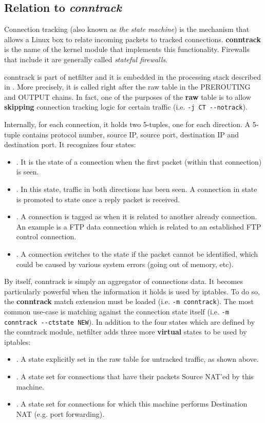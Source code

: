 \subsection{Relation to \emph{conntrack}}\label{sub-sec:conntrack}

Connection tracking (also known as \emph{the state machine}) is the mechanism
that allows a Linux box to relate incoming packets to tracked connections.
\textbf{conntrack} is the name of the kernel module that implements this
functionality.  Firewalls that include it are generally called \emph{stateful
firewalls}.

conntrack is part of netfilter and it is embedded in the processing stack
described in .  More
precisely, it is called right after the raw table in the PREROUTING and OUTPUT
chains.  In fact, one of the purposes of the \textbf{raw} table is to allow
\textbf{skipping} connection tracking logic for certain traffic (i.e.
\lstinline{-j CT --notrack}).

Internally, for each connection, it holds two 5-tuples, one for each direction.
A 5-tuple contains protocol number, source IP, source port, destination IP and
destination port.  It recognizes four states:
\begin{itemize}
  \item \NEW.  It is the state of a connection when the first packet
    (within that connection) is seen.
  \item \ESTABLISHED.  In this state, traffic in both directions has been seen.
    A connection in state \NEW is promoted to state \ESTABLISHED once a reply
    packet is received.
  \item \RELATED.  A connection is tagged as \RELATED when it is related to
    another already \ESTABLISHED connection.  An example is a FTP data
    connection which is related to an established FTP control connection.
  \item \INVALID.  A connection switches to the \INVALID state if the packet
    cannot be identified, which could be caused by various system errors (going
    out of memory, etc).
\end{itemize}

By itself, conntrack is simply an aggregator of connections data.  It becomes
particularly powerful when the information it holds is used by iptables.  To do
so, the \textbf{conntrack} match extension must be loaded (i.e.
\lstinline{-m conntrack}).  The most common use-case is matching against the
connection state itself (i.e. \lstinline{-m conntrack --ctstate NEW}).  In
addition to the four states which are defined by the conntrack module,
netfilter adds three more \textbf{virtual} states to be used by iptables:
\begin{itemize}
  \item \UNTRACKED.  A state explicitly set in the raw table for untracked
    traffic, as shown above.
  \item \SNAT.  A state set for connections that have their packets Source
    NAT'ed by this machine.
  \item \DNAT.  A state set for connections for which this machine performs
    Destination NAT (e.g. port forwarding).
\end{itemize}

